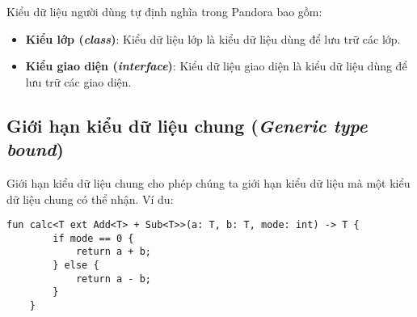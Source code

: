 Kiểu dữ liệu người dùng tự định nghĩa trong Pandora bao gồm:

\begin{itemize}
    \item \textbf{Kiểu lớp (\textit{class})}: Kiểu dữ liệu lớp là kiểu dữ liệu dùng để lưu trữ các lớp.

    \item \textbf{Kiểu giao diện (\textit{interface})}: Kiểu dữ liệu giao diện là kiểu dữ liệu dùng để lưu trữ các giao diện.
\end{itemize}

\subsection{Giới hạn kiểu dữ liệu chung (\textit{Generic type bound})}

\regextypebound

Giới hạn kiểu dữ liệu chung cho phép chúng ta giới hạn kiểu dữ liệu mà một kiểu dữ liệu chung có thể nhận. Ví du:

\begin{lstlisting}[]
    fun calc<T ext Add<T> + Sub<T>>(a: T, b: T, mode: int) -> T {
        if mode == 0 {
            return a + b;
        } else {
            return a - b;
        }
    }
\end{lstlisting}
